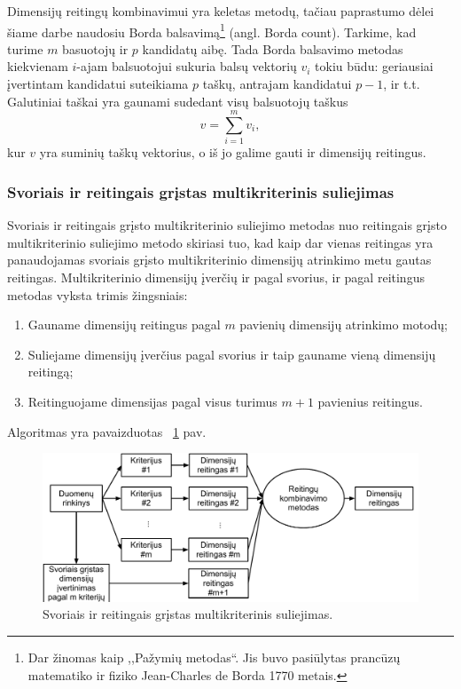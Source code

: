 Dimensijų reitingų kombinavimui yra keletas metodų\cite{dwork2001rank}, tačiau
paprastumo dėlei šiame darbe naudosiu Borda balsavimą\footnote{Dar žinomas kaip
,,Pažymių metodas``. Jis buvo pasiūlytas prancūzų matematiko ir fiziko 
Jean-Charles de Borda 1770 metais.} (angl. Borda count). Tarkime, kad turime
$m$ basuotojų ir $p$ kandidatų aibę. Tada Borda balsavimo metodas kiekvienam
$i$-ajam balsuotojui sukuria balsų vektorių $v_i$ tokiu būdu: geriausiai 
įvertintam kandidatui suteikiama $p$ taškų, antrajam kandidatui $p-1$, ir t.t.
Galutiniai taškai yra gaunami sudedant visų balsuotojų taškus
\begin{equation}
 v = \sum_{i=1}^m v_i,
\end{equation}
kur $v$ yra suminių taškų vektorius, o iš jo galime gauti ir dimensijų reitingus.

\subsubsection{Svoriais ir reitingais grįstas multikriterinis suliejimas}

Svoriais ir reitingais grįsto multikriterinio suliejimo metodas
nuo reitingais grįsto multikriterinio suliejimo metodo skiriasi tuo, kad kaip dar vienas 
reitingas yra panaudojamas svoriais grįsto multikriterinio dimensijų atrinkimo metu
gautas reitingas.
Multikriterinio dimensijų įverčių ir pagal svorius, ir pagal reitingus metodas vyksta trimis
žingsniais:
\begin{enumerate}
  \item Gauname dimensijų reitingus pagal $m$ pavienių dimensijų atrinkimo motodų;
  \item Suliejame dimensijų įverčius pagal svorius ir taip gauname vieną 
  dimensijų reitingą;
  \item Reitinguojame dimensijas pagal visus turimus $m+1$ pavienius reitingus.
\end{enumerate} 
Algoritmas yra pavaizduotas ~\ref{fig:figure3} pav.
\begin{figure}
 \centering
 \includegraphics[width=1\textwidth]{images/score_and_ranking_based_fusion.pdf}
 \caption{Svoriais ir reitingais grįstas multikriterinis suliejimas.}
 \label{fig:figure3}
\end{figure}

